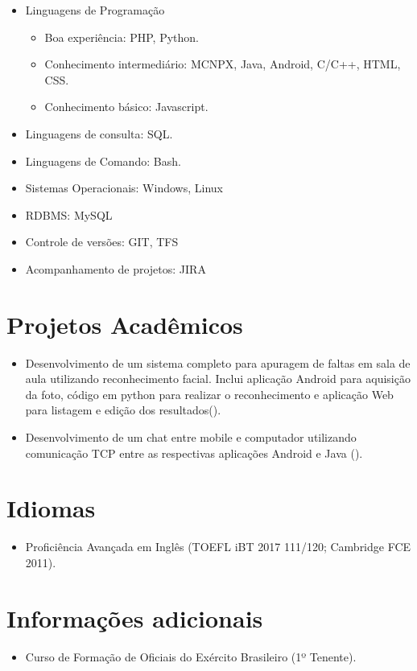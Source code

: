 \documentclass{tccv}
\begin{document}
    \begin{itemize}  
        \item Linguagens de Programação
            \begin{itemize}
                \item Boa experiência: PHP, Python.
                \item Conhecimento intermediário: MCNPX, Java, Android, C/C++, HTML, CSS.
                \item Conhecimento básico: Javascript.
            \end{itemize}
        \item Linguagens de consulta: SQL.
        \item Linguagens de Comando: Bash.
        \item Sistemas Operacionais: Windows, Linux
        \item RDBMS: MySQL 
        \item Controle de versões: GIT, TFS
        \item Acompanhamento de projetos: JIRA
    \end{itemize}

\section{Projetos Acadêmicos}
    
    \begin{itemize}
        \item Desenvolvimento de um sistema completo para apuragem de faltas em sala de aula utilizando reconhecimento facial. Inclui aplicação Android para aquisição da foto, código em python para realizar o reconhecimento e aplicação Web para listagem e edição dos resultados(\href{https://github.com/gdelfs/Tchau-Papeleta-de-Faltas}{\faCode}).
        \item Desenvolvimento de um chat entre mobile e computador utilizando comunicação TCP entre as respectivas aplicações Android e Java (\href{https://github.com/gdelfs/Messenger-Android-Computador}{\faCode}).
    \end{itemize}

\section{Idiomas}
    
    \begin{itemize}
        \item Proficiência Avançada em Inglês (TOEFL iBT 2017 111/120; Cambridge FCE 2011).
    \end{itemize}

\section{Informações adicionais}
    
    \begin{itemize}
        \item Curso de Formação de Oficiais do Exército Brasileiro (1º Tenente).
    \end{itemize}
    
\end{document}
